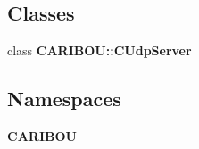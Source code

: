 \subsection*{Classes}
\begin{DoxyCompactItemize}
\item 
class {\bf C\-A\-R\-I\-B\-O\-U\-::\-C\-Udp\-Server}
\end{DoxyCompactItemize}
\subsection*{Namespaces}
\begin{DoxyCompactItemize}
\item 
{\bf C\-A\-R\-I\-B\-O\-U}
\end{DoxyCompactItemize}
